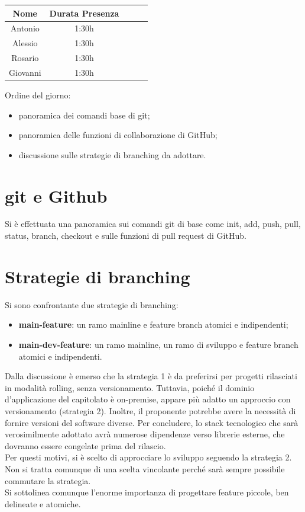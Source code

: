 \documentclass[12pt,a4paper]{article}
\begin{document}
\begin{center}
    \begin{tabular}{ |c|c|c|c|c| }
        \hline
        Nome     & Durata Presenza \\
        \hline
        Antonio  & 1:30h           \\
        \hline
        Alessio & 1:30h           \\
        \hline
        Rosario  & 1:30h           \\
        \hline
        Giovanni  & 1:30h           \\
        \hline

    \end{tabular}
\end{center}

\newpage

Ordine del giorno:
\begin{itemize}
    \item panoramica dei comandi base di git;
    \item panoramica delle funzioni di collaborazione di GitHub;
    \item discussione sulle strategie di branching da adottare.
\end{itemize}

\section{git e Github}
Si è effettuata una panoramica sui comandi git di base come init, add, push, pull, status, branch, checkout e sulle funzioni di pull request di GitHub.

\section{Strategie di branching}
Si sono confrontante due strategie di branching:
\begin{itemize}
    \item \textbf{main-feature}: un ramo mainline e feature branch atomici e indipendenti;
    \item \textbf{main-dev-feature}: un ramo mainline, un ramo di sviluppo e feature branch atomici e indipendenti.
\end{itemize}

Dalla discussione è emerso che la strategia 1 è da preferirsi per progetti rilasciati in modalità rolling, senza versionamento. Tuttavia, poiché il dominio d'applicazione del capitolato è on-premise, appare più adatto un approccio con versionamento (strategia 2).
Inoltre, il proponente potrebbe avere la necessità di fornire versioni del software diverse.
Per concludere, lo stack tecnologico che sarà verosimilmente adottato avrà numerose dipendenze verso librerie esterne, che dovranno essere congelate prima del rilascio.\\
Per questi motivi, si è scelto di approcciare lo sviluppo seguendo la strategia 2. Non si tratta comunque di una scelta vincolante perché sarà sempre possibile commutare la strategia.\\
Si sottolinea comunque l'enorme importanza di progettare feature piccole, ben delineate e atomiche.
\end{document}

